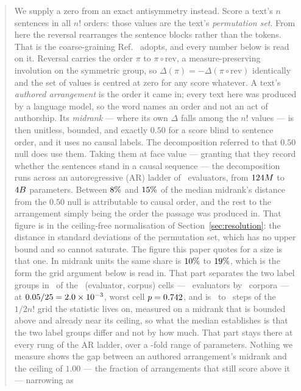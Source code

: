\documentclass[11pt]{article}
\begin{document}
\begin{abstract}
We supply a zero from an exact antisymmetry instead.  Score a text's $n$
sentences in all $n!$ orders: those values are the text's
\emph{permutation set}.  From here the reversal rearranges the
sentence blocks rather than the tokens.  That is the coarse-graining
Ref.~\cite{sagawa2026} adopts, and every number below is read on it.  Reversal carries the
order $\pi$ to
$\pi \circ \mathrm{rev}$, a measure-preserving involution on the symmetric
group, so $\Delta(\pi) = -\Delta(\pi \circ \mathrm{rev})$ identically and the
set of values is centred at zero for any score whatever.  A text's
\emph{authored arrangement} is the order it came in; every text here was
produced by a language model, so the word names an order and not an act of
authorship.  Its \emph{midrank} --- where its own $\Delta$ falls among the
$n!$ values --- is then unitless, bounded, and exactly $0.50$ for a score
blind to sentence order, and it uses no causal labels.  The
decomposition referred to that $0.50$ null does use them.  Taking them at face
value --- granting that they record whether the sentences stand in a causal
sequence --- the decomposition runs across an autoregressive
(AR) ladder of \TrendNEval\ evaluators, from $\ParamsGPTtwo$ to $\ParamsQwen$ parameters.
Between $\ShareZMin\%$ and $\ShareZMax\%$ of the median midrank's distance
from the $0.50$ null is attributable to causal order, and the rest to the
arrangement simply being the order the passage was produced in.  That figure is in the
ceiling-free
normalisation of Section~\ref{sec:resolution}: the distance in standard
deviations of the permutation set, which has no upper bound and so cannot
saturate.  The figure this paper quotes for a size is that one.  In midrank
units the same share is $\ShareEvalMin\%$ to $\ShareEvalMax\%$, which is the
form the grid argument below is read in.  That
part separates the two label groups in \ContrastNRejecting\ of the
\ContrastNCells\ (evaluator, corpus) cells --- \ContrastNEval\ evaluators by
\ContrastNCorpora\ corpora --- at
$0.05/\ContrastNCells = \ContrastBonferroni$, worst cell
$p = \ContrastPWorst$, and is
\CausalCompStepsMin\ to \CausalCompStepsMax\ steps of the $1/2n!$ grid the
statistic lives on, measured on a midrank that is bounded above and
already near its ceiling, so what the median
establishes is that the two label groups differ and not by how much.  That part stays
there at every rung of the AR ladder,
over a \TrendCapSpan-fold range of parameters.  Nothing we measure shows
the gap between an authored arrangement's midrank and the ceiling of $1.00$
--- the fraction of arrangements that still score above it --- narrowing as

\end{abstract}
\end{document}
